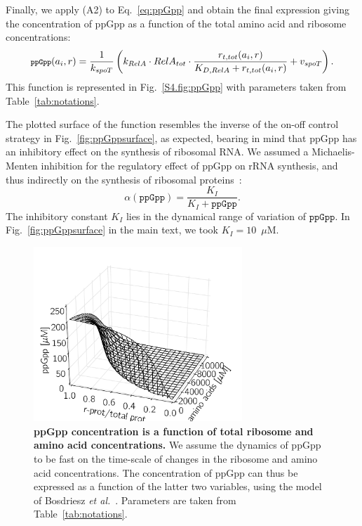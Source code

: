 Finally, we apply (A2) to Eq.~\ref{eq:ppGpp} and obtain the final expression giving the concentration of ppGpp as a function of the total amino acid and ribosome concentrations:
\begin{equation}
\footnotesize
\texttt{ppGpp}(a_i, r) = \frac{1}{k_{spoT}} \left( k_{RelA} \cdot RelA_{tot} \cdot \frac{r_{t,tot}(a_i, r)}{K_{D,RelA} + r_{t,tot}(a_i,r)} + v_{spoT} \right).
\end{equation}
This function is represented in Fig.~\ref{S4.fig:ppGpp} with parameters taken from Table~\ref{tab:notations}.

The plotted surface of the function resembles the inverse of the on-off control strategy in Fig.~\ref{fig:ppGppsurface}, as expected, bearing in mind that ppGpp has an inhibitory effect on the synthesis of ribosomal RNA.
We assumed a Michaelis-Menten inhibition for the regulatory effect of ppGpp on rRNA synthesis, and thus indirectly on the synthesis of ribosomal proteins~\cite{potrykus_pppgpp_2008,keener_regulation_1996}:
\begin{equation}
\alpha (\texttt{ppGpp}) = \frac{K_I}{K_I + \texttt{ppGpp}}.
\end{equation}
The inhibitory constant $K_I$ lies in the dynamical range of variation of $\texttt{ppGpp}$.
In Fig.~\ref{fig:ppGppsurface} in the main text, we took $K_I = 10$~$\mu$M.

\begin{figure}[p]
\centering
\includegraphics[width=0.7\textwidth]{./Fig/FigS4-1}
\caption[ppGpp concentration is a function of total ribosome and amino acid concentrations.]
{
{\bf ppGpp concentration is a function of total ribosome and amino acid concentrations.}\newline
We assume the dynamics of ppGpp to be fast on the time-scale of changes in the ribosome and amino acid concentrations.
The concentration of ppGpp can thus be expressed as a function of the latter two variables, using the model of Bosdriesz \textit{et al.}~\cite{bosdriesz_how_2015}.
Parameters are taken from Table~\ref{tab:notations}.
}
\label{fig:ppGpp}
\end{figure}

